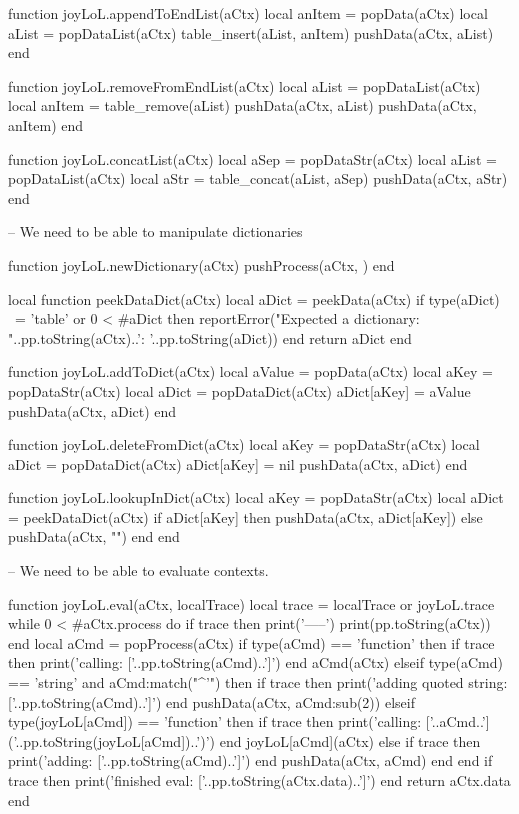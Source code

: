 {{{{function joyLoL.appendToEndList(aCtx)
  local anItem = popData(aCtx)
  local aList  = popDataList(aCtx)
  table_insert(aList, anItem)
  pushData(aCtx, aList)
end

function joyLoL.removeFromEndList(aCtx)
  local aList = popDataList(aCtx)
  local anItem = table_remove(aList)
  pushData(aCtx, aList)
  pushData(aCtx, anItem)
end

function joyLoL.concatList(aCtx)
  local aSep  = popDataStr(aCtx)
  local aList = popDataList(aCtx)
  local aStr = table_concat(aList, aSep)
  pushData(aCtx, aStr)
end

-- We need to be able to manipulate dictionaries

function joyLoL.newDictionary(aCtx)
  pushProcess(aCtx, {})
end

local function peekDataDict(aCtx)
  local aDict = peekData(aCtx)
  if type(aDict) ~= 'table' or 0 < #aDict then
    reportError("Expected a dictionary\naCtx: "..pp.toString(aCtx)..'\naDict: '..pp.toString(aDict))
  end
  return aDict
end

function joyLoL.addToDict(aCtx)
  local aValue = popData(aCtx)
  local aKey   = popDataStr(aCtx)
  local aDict  = popDataDict(aCtx)
  aDict[aKey] = aValue
  pushData(aCtx, aDict)
end

function joyLoL.deleteFromDict(aCtx)
  local aKey  = popDataStr(aCtx)
  local aDict = popDataDict(aCtx)
  aDict[aKey] = nil
  pushData(aCtx, aDict)
end

function joyLoL.lookupInDict(aCtx)
  local aKey  = popDataStr(aCtx)
  local aDict = peekDataDict(aCtx)
  if aDict[aKey] then
    pushData(aCtx, aDict[aKey])
  else
    pushData(aCtx, "")
  end
end

-- We need to be able to evaluate contexts.

function joyLoL.eval(aCtx, localTrace)
  local trace = localTrace or joyLoL.trace
  while 0 < #aCtx.process do
    if trace then
      print('\n\n-----')
      print(pp.toString(aCtx))
    end
    local aCmd = popProcess(aCtx)
    if type(aCmd) == 'function' then
      if trace then print('calling: ['..pp.toString(aCmd)..']') end
      aCmd(aCtx)
    elseif type(aCmd) == 'string' and aCmd:match("^'") then
      if trace then print('adding quoted string: ['..pp.toString(aCmd)..']') end
      pushData(aCtx, aCmd:sub(2))
    elseif type(joyLoL[aCmd]) == 'function' then
      if trace then print('calling: ['..aCmd..']('..pp.toString(joyLoL[aCmd])..')') end
      joyLoL[aCmd](aCtx)
    else
      if trace then print('adding: ['..pp.toString(aCmd)..']') end
      pushData(aCtx, aCmd)
    end
  end
  if trace then print('finished eval: ['..pp.toString(aCtx.data)..']') end
  return aCtx.data
end

}}}}
